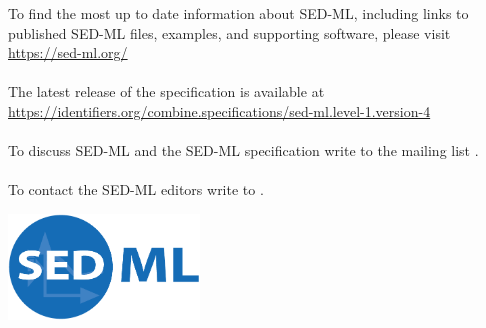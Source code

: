 \begin{titlepage}
\begin{center}
\vspace{1.2in}

\normalsize
\begin{minipage}{5.5in}
\begin{center}
  To find the most up to date information about SED-ML, including links to published SED-ML files, examples, and supporting software, please visit\linebreak
  \url{https://sed-ml.org/}

  \paragraph*{}
  The latest release of the \currentLV specification is available at
  \url{https://identifiers.org/combine.specifications/sed-ml.level-1.version-4}

  \paragraph*{}
  To discuss SED-ML and the SED-ML specification write to the mailing list .

  \paragraph*{}
  To contact the SED-ML editors write to .
\end{center}
\end{minipage}
\vfill


\centerline{\includegraphics[width=2in]{images/logoSedml.png}}

\end{center}

\end{titlepage}

%
%

\setcounter{page}{2}



